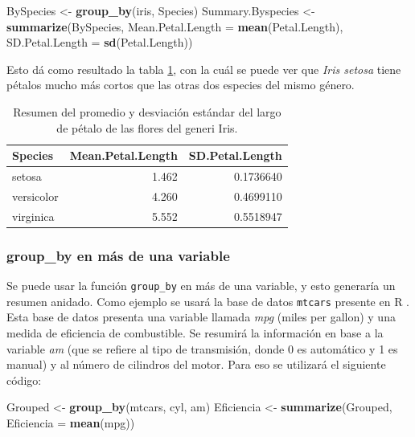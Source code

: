 \documentclass[]{book}
\newenvironment{Shaded}{\begin{snugshade}}{\end{snugshade}}
\newcommand{\DataTypeTok}[1]{\textcolor[rgb]{0.13,0.29,0.53}{#1}}
\newcommand{\KeywordTok}[1]{\textcolor[rgb]{0.13,0.29,0.53}{\textbf{#1}}}
\newcommand{\NormalTok}[1]{#1}
\newcommand{\StringTok}[1]{\textcolor[rgb]{0.31,0.60,0.02}{#1}}
\begin{document}
\begin{Shaded}
\begin{Highlighting}[]
\NormalTok{BySpecies <-}\StringTok{ }\KeywordTok{group_by}\NormalTok{(iris, Species)}
\NormalTok{Summary.Byspecies <-}\StringTok{ }\KeywordTok{summarize}\NormalTok{(BySpecies, }\DataTypeTok{Mean.Petal.Length =} \KeywordTok{mean}\NormalTok{(Petal.Length), }
    \DataTypeTok{SD.Petal.Length =} \KeywordTok{sd}\NormalTok{(Petal.Length))}
\end{Highlighting}
\end{Shaded}

Esto dá como resultado la tabla \ref{tab:SummaryBySpecies}, con la cuál
se puede ver que \emph{Iris setosa} tiene pétalos mucho más cortos que
las otras dos especies del mismo género.

\begin{table}

\caption{\label{tab:SummaryBySpecies}Resumen del promedio y desviación estándar del largo de pétalo de las flores del generi Iris.}
\centering
\begin{tabular}[t]{lrr}
\toprule
Species & Mean.Petal.Length & SD.Petal.Length\\
\midrule
setosa & 1.462 & 0.1736640\\
versicolor & 4.260 & 0.4699110\\
virginica & 5.552 & 0.5518947\\
\bottomrule
\end{tabular}
\end{table}

\hypertarget{group_by-en-mas-de-una-variable}{%
\subsubsection{group\_by en más de una
variable}\label{group_by-en-mas-de-una-variable}}

Se puede usar la función \texttt{group\_by} en más de una variable, y
esto generaría un resumen anidado. Como ejemplo se usará la base de
datos \texttt{mtcars} presente en R \citep{henderson1981building}. Esta
base de datos presenta una variable llamada \emph{mpg} (miles per
gallon) y una medida de eficiencia de combustible. Se resumirá la
información en base a la variable \emph{am} (que se refiere al tipo de
transmisión, donde 0 es automático y 1 es manual) y al número de
cilindros del motor. Para eso se utilizará el siguiente código:

\begin{Shaded}
\begin{Highlighting}[]
\NormalTok{Grouped <-}\StringTok{ }\KeywordTok{group_by}\NormalTok{(mtcars, cyl, am)}
\NormalTok{Eficiencia <-}\StringTok{ }\KeywordTok{summarize}\NormalTok{(Grouped, }\DataTypeTok{Eficiencia =} \KeywordTok{mean}\NormalTok{(mpg))}
\end{Highlighting}
\end{Shaded}
\end{document}
